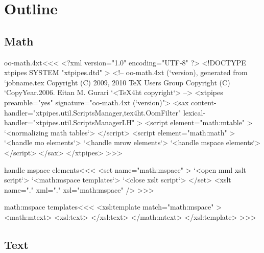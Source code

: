 \documentclass{article}
\begin{document}




\section{Outline}


\subsection{Math}








\<oo-math.4xt\><<<
<?xml version="1.0" encoding="UTF-8" ?>
<!DOCTYPE xtpipes SYSTEM "xtpipes.dtd" >
<!-- oo-math.4xt (`version), generated from `jobname.tex
     Copyright (C) 2009, 2010 TeX Users Group
     Copyright (C) `CopyYear.2006. Eitan M. Gurari
`<TeX4ht copyright`> -->
<xtpipes preamble="yes" signature="oo-math.4xt (`version)">
   <sax content-handler="xtpipes.util.ScriptsManager,tex4ht.OomFilter" 
        lexical-handler="xtpipes.util.ScriptsManagerLH" >
      <script element="math:mtable" >
         `<normalizing math tables`>
      </script> 
      <script element="math:math" >
         `<handle mo elements`>
         `<handle mrow elements`>
         `<handle mspace elements`>
      </script> 
   </sax>
</xtpipes>
>>>







\<handle mspace elements\><<<
<set name="math:mspace" >
   `<open mml xslt script`>
   `<math:mspace templates`>
   `<close xslt script`>
</set>
<xslt name="." xml="." xsl="math:mspace" />
>>>


\<math:mspace templates\><<<
<xsl:template match="math:mspace" >
  <math:mtext>  
     <xsl:text> </xsl:text>
  </math:mtext>
</xsl:template> 
>>>




\subsection{Text}







\end{document}
